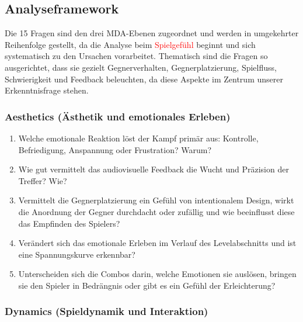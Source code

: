 \documentclass[../Main.tex]{subfiles}
\begin{document}
\subsection{Analyseframework} \label{sec:Analysefragebogen}

Die 15 Fragen sind den drei MDA-Ebenen zugeordnet und werden in umgekehrter Reihenfolge gestellt, da die Analyse beim \textcolor{red}{Spielgefühl} beginnt und sich systematisch zu den Ursachen vorarbeitet. Thematisch sind die Fragen so ausgerichtet, dass sie gezielt Gegnerverhalten, Gegnerplatzierung, Spielfluss, Schwierigkeit und Feedback beleuchten, da diese Aspekte im Zentrum unserer Erkenntnisfrage stehen.

\subsubsection{Aesthetics (Ästhetik und emotionales Erleben)}

\begin{enumerate}[label=\textbf{A\arabic*}, leftmargin=1.5cm, itemsep=0.5em]
    \item Welche emotionale Reaktion löst der Kampf primär aus: Kontrolle, Befriedigung, Anspannung oder Frustration? Warum?
    \item Wie gut vermittelt das audiovisuelle Feedback die Wucht und Präzision der Treffer? Wie?
    \item Vermittelt die Gegnerplatzierung ein Gefühl von intentionalem Design, wirkt die Anordnung der Gegner durchdacht oder zufällig und wie beeinflusst diese das Empfinden des Spielers?
    \item Verändert sich das emotionale Erleben im Verlauf des Levelabschnitts und ist eine Spannungskurve erkennbar?
    \item Unterscheiden sich die Combos darin, welche Emotionen sie auslösen, bringen sie den Spieler in Bedrängnis oder gibt es ein Gefühl der Erleichterung?
\end{enumerate}

\subsubsection{Dynamics (Spieldynamik und Interaktion)}
\end{document}
